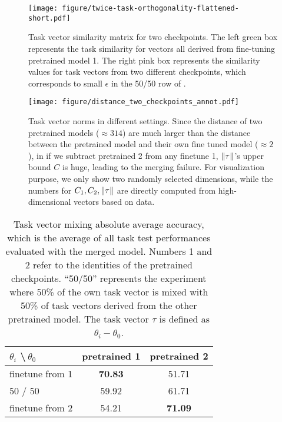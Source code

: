 \begin{figure}[tb]
    \centering
    \texttt{[image: figure/twice-task-orthogonality-flattened-short.pdf]}
    \vspace{-0.5cm}
    \caption{Task vector similarity matrix for two checkpoints. The left green box represents the task similarity for vectors all derived from fine-tuning pretrained model 1. The right pink box represents the similarity values for task vectors from two different checkpoints, which corresponds to small $\epsilon$ in the 50/50 row of .}
    \label{fig:twice-task-orthogonality}
\end{figure}

\begin{figure}[tb]
    \centering
    \texttt{[image: figure/distance\_two\_checkpoints\_annot.pdf]}
    \vspace{-0.8cm}
    \caption{Task vector norms in different settings. Since the distance of two pretrained models ($\approx 314$) are much larger than the distance between the pretrained model and their own fine tuned model ($\approx 2$), in  if we subtract pretrained 2 from any finetune 1, $\left\lVert\tau\right\rVert$'s upper bound $C$ is huge, leading to the merging failure. For visualization purpose, we only show two randomly selected dimensions, while the numbers for $C_1,C_2, \left\lVert\tau\right\rVert$ are directly computed from high-dimensional vectors based on data.}
    \label{fig:task-vector-norm-avg}
\end{figure}

\begin{table}[tb]
\caption{Task vector mixing absolute average accuracy, which is the average of all task test performances evaluated with the merged model. Numbers 1 and 2 refer to the identities of the pretrained checkpoints. “50/50” represents the experiment where 50\% of the own task vector is mixed with 50\% of task vectors derived from the other pretrained model. The task vector $\tau$ is defined as $\theta_i - \theta_0$.}
\label{tab:twice-task-orthogonality}
\centering
\begin{tabular}{@{}lcc@{}}
\toprule
$\theta_i$ \textbackslash $\ \theta_0$ & pretrained 1 & pretrained 2 \\ \midrule
 finetune from 1             & \textbf{70.83}        & 51.71        \\
 50 / 50                   & 59.92        & 61.71        \\
 finetune from 2             & 54.21        & \textbf{71.09}        \\ \bottomrule
\end{tabular}
\end{table}


